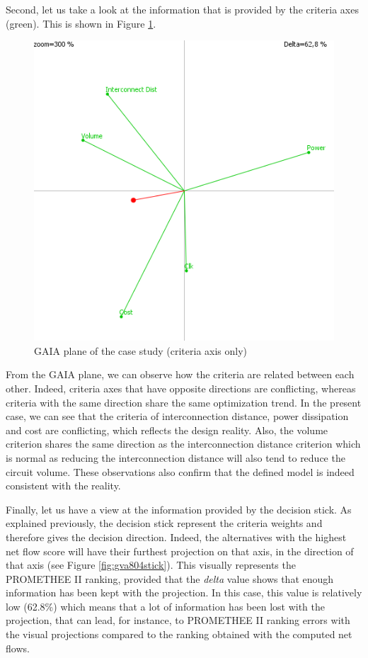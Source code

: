 Second, let us take a look at the information that is provided by the criteria axes (green). This is shown in Figure \ref{fig:gva804crit}.

\begin{figure}[h!]
\begin{center}
\includegraphics[width=0.8\linewidth]{gva804crit}
\end{center}
\caption{GAIA plane of the case study (criteria axis only)}
\label{fig:gva804crit}
\end{figure}

From the GAIA plane, we can observe how the criteria are related between each other. Indeed, criteria axes that have opposite directions are conflicting, whereas criteria with the same direction share the same optimization trend. In the present case, we can see that the criteria of interconnection distance, power dissipation and cost are conflicting, which reflects the design reality. Also, the volume criterion shares the same direction as the interconnection distance criterion which is normal as reducing the interconnection distance will also tend to reduce the circuit volume. These observations also confirm that the defined model is indeed consistent with the reality.

Finally, let us have a view at the information provided by the decision stick. As explained previously, the decision stick represent the criteria weights and therefore gives the decision direction. Indeed, the alternatives with the highest net flow score will have their furthest projection on that axis, in the direction of that axis (see Figure \ref{fig:gva804stick}). This visually represents the PROMETHEE II ranking, provided that the \textit{delta} value shows that enough information has been kept with the projection. In this case, this value is relatively low (62.8\%) which means that a lot of information has been lost with the projection, that can lead, for instance, to PROMETHEE II ranking errors with the visual projections compared to the ranking obtained with the computed net flows.

